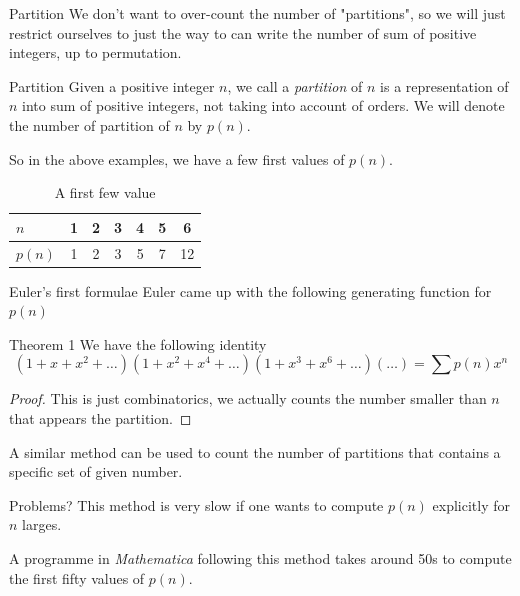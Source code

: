 \documentclass[pdf]{beamer}
\begin{document}
\begin{frame}{Partition}
    We don't want to over-count the number of "partitions", so we will just restrict ourselves to just the way to can write the number of sum of positive integers, up to permutation. \pause
    \begin{block}{Partition}
        Given a positive integer $n$, we call a \textit{partition} of $n$ is a representation of $n$ into sum of positive integers, not taking into account of orders. We will denote the number of partition of $n$ by $p(n)$.
    \end{block} \pause
    So in the above examples, we have a few first values of $p(n)$.
    \begin{table}
\begin{tabular}{l  |c | c|  c|  c|c|c| }
$n$ & 1 & 2 & 3 & 4 & 5 & 6 \\
\hline\pause
 $p(n)$ & 1 & 2 & 3 & 5 & 7 & 12
\end{tabular}
\caption{ A first few value}
\end{table}
\end{frame}
\begin{frame}{Euler's first formulae}
Euler came up with the following generating function for $p(n)$
\begin{block}{Theorem 1}
    We have the following identity
    \[(1+x+x^2+\ldots)(1+x^2+x^4+\ldots)(1+x^3+x^6+\ldots)(\ldots) = \sum p(n)x^n\]
\end{block}
\begin{proof}
    This is just combinatorics, we actually counts the number smaller than $n$ that appears the partition.
\end{proof}
A similar method can be used to count the number of partitions that contains a specific set of given number. 
\end{frame}
\begin{frame}{Problems?}
    This method is very slow if one wants to compute $p(n)$ explicitly for $n$ larges.

    A programme in \textit{Mathematica} following this method takes around 50s to compute the first fifty values of $p(n)$. 
\end{frame}
\end{document}

